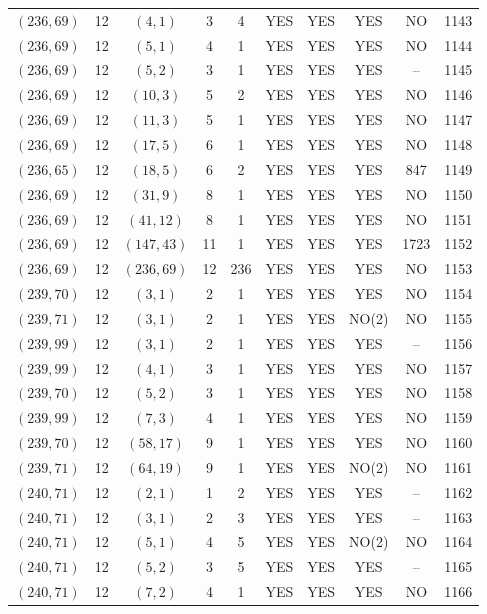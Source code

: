 \begin{longtable}{|c|c|c|c|c|c|c|c|c|c|}
$(236, 69)$ & 12 & $(4, 1)$ & 3 & 4 & YES & YES & YES & NO & 1143\\
$(236, 69)$ & 12 & $(5, 1)$ & 4 & 1 & YES & YES & YES & NO & 1144\\
$(236, 69)$ & 12 & $(5, 2)$ & 3 & 1 & YES & YES & YES & -- & 1145\\
$(236, 69)$ & 12 & $(10, 3)$ & 5 & 2 & YES & YES & YES & NO & 1146\\
$(236, 69)$ & 12 & $(11, 3)$ & 5 & 1 & YES & YES & YES & NO & 1147\\
$(236, 69)$ & 12 & $(17, 5)$ & 6 & 1 & YES & YES & YES & NO & 1148\\
$(236, 65)$ & 12 & $(18, 5)$ & 6 & 2 & YES & YES & YES & 847 & 1149\\
$(236, 69)$ & 12 & $(31, 9)$ & 8 & 1 & YES & YES & YES & NO & 1150\\
$(236, 69)$ & 12 & $(41, 12)$ & 8 & 1 & YES & YES & YES & NO & 1151\\
$(236, 69)$ & 12 & $(147, 43)$ & 11 & 1 & YES & YES & YES & 1723 & 1152\\
$(236, 69)$ & 12 & $(236, 69)$ & 12 & 236 & YES & YES & YES & NO & 1153\\
$(239, 70)$ & 12 & $(3, 1)$ & 2 & 1 & YES & YES & YES & NO & 1154\\
$(239, 71)$ & 12 & $(3, 1)$ & 2 & 1 & YES & YES & NO(2) & NO & 1155\\
$(239, 99)$ & 12 & $(3, 1)$ & 2 & 1 & YES & YES & YES & -- & 1156\\
$(239, 99)$ & 12 & $(4, 1)$ & 3 & 1 & YES & YES & YES & NO & 1157\\
$(239, 70)$ & 12 & $(5, 2)$ & 3 & 1 & YES & YES & YES & NO & 1158\\
$(239, 99)$ & 12 & $(7, 3)$ & 4 & 1 & YES & YES & YES & NO & 1159\\
$(239, 70)$ & 12 & $(58, 17)$ & 9 & 1 & YES & YES & YES & NO & 1160\\
$(239, 71)$ & 12 & $(64, 19)$ & 9 & 1 & YES & YES & NO(2) & NO & 1161\\
$(240, 71)$ & 12 & $(2, 1)$ & 1 & 2 & YES & YES & YES & -- & 1162\\
$(240, 71)$ & 12 & $(3, 1)$ & 2 & 3 & YES & YES & YES & -- & 1163\\
$(240, 71)$ & 12 & $(5, 1)$ & 4 & 5 & YES & YES & NO(2) & NO & 1164\\
$(240, 71)$ & 12 & $(5, 2)$ & 3 & 5 & YES & YES & YES & -- & 1165\\
$(240, 71)$ & 12 & $(7, 2)$ & 4 & 1 & YES & YES & YES & NO & 1166\\

\end{longtable}
